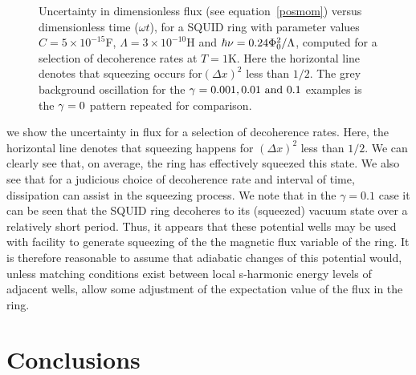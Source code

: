\documentclass[12pt,a4paper,superscriptaddress,showpacs,floatfix,pra]{revtex4-2}
\begin{document}
\begin{figure}[!t]
\begin{center}
\end{center}
\caption{      Uncertainty     in     dimensionless      flux     (see
equation~\ref{posmom}) versus  dimensionless time ($\omega t$), for  a SQUID
ring  with parameter values  $C=5\times 10^{-15}$F,  $\Lambda =3\times
10^{-10}$H  and  $\hbar   \protect\nu  =0.24\Phi  _{0}^{2}/\Lambda  $,
computed  for a  selection of  decoherence rates  at $T=1$K.  Here the
horizontal  line  denotes  that  squeezing  occurs  for$\left(  \Delta
x\right) ^{2}$  less than $1/2$.  The grey background  oscillation for
the  $\protect\gamma=0.001,  0.01\text{  and  }0.1$  examples  is  the
$\protect\gamma=0$ pattern repeated for comparison.}
\label{f6}
\end{figure}
we  show  the uncertainty  in  flux  for  a selection  of  decoherence
rates. Here,  the horizontal line  denotes that squeezing  happens for
$\left(  \Delta x\right)  ^{2}$ less  than $1/2$.  We can  clearly see
that, on  average, the  ring has effectively  squeezed this  state. We
also see that for a  judicious choice of decoherence rate and interval
of time, dissipation can assist in the squeezing process. We note that
in the $\gamma=0.1$ case it can  be seen that the SQUID ring decoheres
to its (squeezed)  vacuum state over a relatively  short period. Thus,
it appears  that these  potential wells may  be used with  facility to
generate squeezing of  the the magnetic flux variable  of the ring. It
is  therefore reasonable  to  assume that  adiabatic  changes of  this
potential  would,  unless  matching  conditions  exist  between  local
s-harmonic energy  levels of adjacent wells, allow  some adjustment of
the expectation value of the flux in the ring.

\section{Conclusions}
\end{document}
